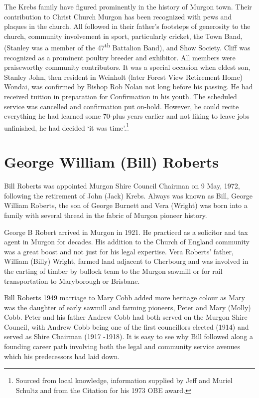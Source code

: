 The Krebs family have figured prominently in the history of Murgon town. Their contribution to Christ Church Murgon has been recognized with pews and plaques in the church. All followed in their father's footsteps of generosity to the church, community involvement in sport, particularly cricket, the Town Band, (Stanley was a member of the 47\textsuperscript{th} Battalion Band), and Show Society. Cliff was recognized as a prominent poultry breeder and exhibitor. All members were praiseworthy community contributors. It was a special occasion when eldest son, Stanley John, then resident in Weinholt (later Forest View Retirement Home) Wondai, was confirmed by Bishop Rob Nolan not long before his passing. He had received tuition in preparation for Confirmation in his youth. The scheduled service was cancelled and confirmation put on-hold. However, he could recite everything he had learned some 70-plus years earlier and not liking to leave jobs unfinished, he had decided `it was time'.\footnote{Sourced from local knowledge, information supplied by Jeff and Muriel Schultz and from the Citation for his 1973 OBE award.}


\section{George William (Bill) Roberts}



Bill Roberts was appointed Murgon Shire Council Chairman on 9 May, 1972, following the retirement of John (Jack) Krebs. Always was known as Bill, George William Roberts, the son of George Burnett and Vera (Wright) was born into a family with several thread in the fabric of Murgon pioneer history.



George B Robert arrived in Murgon in 1921. He practiced as a solicitor and tax agent in Murgon for decades. His addition to the Church of England community was a great boost and not just for his legal expertise. Vera Roberts' father, William (Billy) Wright, farmed land adjacent to Cherbourg and was involved in the carting of timber by bullock team to the Murgon sawmill or for rail transportation to Maryborough or Brisbane.



Bill Roberts 1949 marriage to Mary Cobb added more heritage colour as Mary was the daughter of early sawmill and farming pioneers, Peter and Mary (Molly) Cobb. Peter and his father Andrew Cobb had both served on the Murgon Shire Council, with Andrew Cobb being one of the first councillors elected (1914) and served as Shire Chairman (1917 -1918). It is easy to see why Bill followed along a founding career path involving both the legal and community service avenues which his predecessors had laid down.



